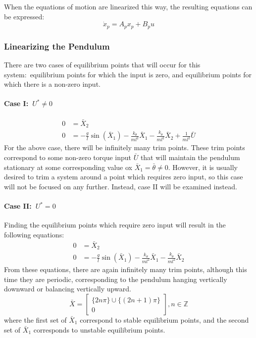 When the equations of motion are linearized this way, the resulting equations can be expressed:
\begin{equation*}
  \dot{x}_{p}=A_{p}x_{p}+B_{p}u
\end{equation*}

\subsubsection{Linearizing the Pendulum}

There are two cases of equilibrium points that will occur for this system:\ equilibrium points for which the input is zero, and equilibrium points for which there is a non-zero input.

\paragraph{Case I:\ $U^{*}\neq 0$}
\begin{equation*}
  \begin{split}
    0&=\bar{X}_{2} \\
    0&=-\frac{g}{l}\sin(\bar{X}_{1})-\frac{k_{\theta}}{ml^{2}}\bar{X}_{1}-\frac{k_{\dot{\theta}}}{ml^2}\bar{X}_2+\frac{1}{ml^2}\bar{U}
  \end{split}
\end{equation*}
For the above case, there will be infinitely many trim points.
These trim points correspond to some non-zero torque input $\bar{U}$ that will maintain the pendulum stationary at some corresponding value ox $\bar{X}_{1}=\bar{\theta}\neq0$.
However, it is usually desired to trim a system around a point which requires zero input, so this case will not be focused on any further.
Instead, case II will be examined instead.

\paragraph{Case II:\ $U^{*}=0$} Finding the equilibrium points which require zero input will result in the following equations:
\begin{equation*}
  \begin{split}
    0&=\bar{X}_{2} \\
    0&=-\frac{g}{l}\sin(\bar{X}_{1})-\frac{k_{\theta}}{ml^2}\bar{X}_{1}-\frac{k_{\dot{\theta}}}{ml^2}\bar{X}_2
  \end{split}
\end{equation*}
From these equations, there are again infinitely many trim points, although this time they are periodic, corresponding to the pendulum hanging vertically downward or balancing vertically upward.
\begin{equation*}
  \bar{X}=
  \begin{bmatrix}
    \{2n\pi\}\cup\{(2n+1)\pi\} \\
    0
  \end{bmatrix}
  , n \in \mathbb{Z}
\end{equation*}
where the first set of $\bar{X}_{1}$ correspond to stable equilibrium points, and the second set of $\bar{X}_{1}$ corresponds to unstable equilibrium points.

